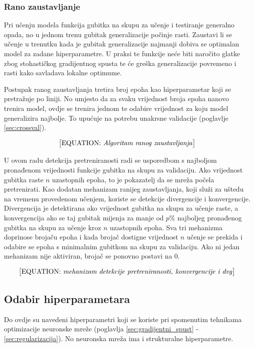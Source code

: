 \documentclass[times, utf8, numeric, diplomski]{fer}
\def\secref#1{(poglavlje \ref{#1})}
\def\todoeq#1{\textcolor{red}{\begin{equation}\text{\big[EQUATION: \textit{#1}\big]}\end{equation}}}
\begin{document}
\subsubsection{Rano zaustavljanje}
Pri učenju modela funkcija gubitka na skupu za učenje i testiranje generalno opada, no u jednom trenu gubitak generalizacije počinje rasti. Zaustavi li se učenje u trenutku kada je gubitak generalizacije najmanji dobiva se optimalan model za zadane hiperparametre. U praksi te funkcije neće biti naročito glatke zbog stohastičkog gradijentnog spusta te će greška generalizacije povremeno i rasti kako savladava lokalne optimume.

Postupak ranog zaustavljanja tretira broj epoha kao hiperparametar koji se pretražuje po liniji. No umjesto da za svaku vrijednost broja epoha nanovo trenira model, ovdje se trenira jednom te odabire vrijednost za koju model generalizira najbolje. To upućuje na potrebu unakrsne validacije \secref{sec:crossval}.

\todoeq{Algoritam ranog zaustavljanja}

U ovom radu detekcija pretreniranosti radi se usporedbom s najboljom pronađenom vrijednosti funkcije gubitka na skupu za validaciju. Ako vrijednost gubitka raste $n$ uzastopnih epoha, to je pokazatelj da se mreža počela pretrenirati. Kao dodatan mehanizam ranijeg zaustavljanja, koji služi za uštedu na vremenu provedenom učenjem, koriste se detekcije divergencije i konvergencije. Divergencija je detektirana ako vrijednost gubitka na skupu za učenje raste, a konvergencija ako se taj gubitak mijenja za manje od $p\%$ najboljeg pronađenog gubitka na skupu za učenje kroz $n$ uzastopnih epoha. Sva tri mehanizma doprinose brojaču epoha i kada brojač dostigne vrijednost $n$ učenje se prekida i odabire se epoha s minimalnim gubitkom na skupu za validaciju. Ako ni jedan mehanizam nije aktiviran, brojač se ponovno postavi na $0$.

\todoeq{mehanizam detekcije pretreniranosti, konvergencije i dvg}

\begin{algorithm}

\end{algorithm}

\subsection{Odabir hiperparametara}
Do ovdje su navedeni hiperparametri koji se koriste pri spomenutim tehnikama optimizacije neuronske mreže (poglavlja \ref{sec:gradijentni_spust} - \ref{sec:regularizacija}). No neuronska mreža ima i strukturalne hiperparametre.
\end{document}
